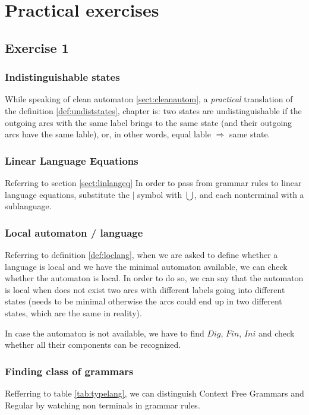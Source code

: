 \chapter{Practical exercises}
    \section{Exercise 1}
        \subsection{Indistinguishable states}
            While speaking of clean automaton \ref{sect:cleanautom}, a \emph{practical} translation of the definition \ref{def:undiststates}, chapter is: two states are 
            undistinguishable if the outgoing arcs with the same label brings to the same state (and their outgoing arcs have the same lable), or, in other words, 
            equal lable $\Rightarrow$ same state.
        \subsection{Linear Language Equations}\label{ese:linlangeq}
            Referring to section \ref{sect:linlangeq}
            In order to pass from grammar rules to linear language equations, substitute the $\vert$ symbol with $\bigcup$, and each nonterminal with a sublanguage.
        \subsection{Local automaton / language}\label{sect:practlocautom}
            Referring to definition \ref{def:loclang}, when we are asked to define whether a language is local and we have the minimal automaton available, we can check 
            whether the automaton is local. In order to do so, we can say that the automaton is local when does not exist two arcs with different labels going into 
            different states (needs to be minimal otherwise the arcs could end up in two different states, which are the same in reality).

            In case the automaton is not available, we have to find $Dig$, $Fin$, $Ini$ and check whether all their components can be recognized.
        \subsection{Finding class of grammars}
            Refferring to table \ref{tab:typelang}, we can distinguish Context Free Grammars and Regular by watching non terminals in grammar rules.

